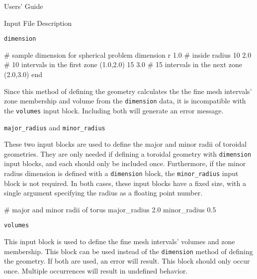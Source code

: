 \begin{chapter}{Users' Guide\label{app:user.guide}}
\begin{section}{Input File Description\label{app:user.input}}
\begin{subsection}{\texttt{dimension}\label{app:user.input.dim}}
      \begin{center}
        \renewcommand{\baselinestretch}{1}\normalsize
        \begin{boxedverbatim}
# sample dimension for spherical problem 
dimension r 1.0      # inside radius 
         10 2.0      # 10 intervals in the first zone (1.0,2.0)
         15 3.0      # 15 intervals in the next zone (2.0,3.0) 
end
\end{boxedverbatim}
      \end{center}
      
      Since this method of defining the geometry calculates the the
      fine mesh intervals' zone membership and volume from the
      \texttt{dimension} data, it is incompatible with the
      \texttt{volumes} input block.  Including both will generate an
      error message.
    \end{subsection}

    \begin{subsection}{\texttt{major\_radius} and  \texttt{minor\_radius} \label{app:user.input.tor_radii}}
      
      These two input blocks are used to define the major and minor
      radii of toroidal geometries.  They are only needed if defining
      a toroidal geometry with \texttt{dimension} input blocks, and
      each should only be included once.  Furthermore, if the minor
      radius dimension is defined with a \texttt{dimension} block, the
      \texttt{minor\_radius} input block is not required.  In both
      cases, these input blocks have a fixed size, with a single
      argument specifying the radius as a floating point number.

      \begin{center}
        \renewcommand{\baselinestretch}{1}\normalsize
        \begin{boxedverbatim}
# major and minor radii of torus
major_radius     2.0
minor_radius     0.5          
\end{boxedverbatim}
      \end{center}

    \end{subsection}

    \begin{subsection}{\texttt{volumes}\label{app:user.input.vol}}
      
      This input block is used to define the fine mesh intervals'
      volumes and zone membership.  This block can be used instead of
      the \texttt{dimension} method of defining the geometry.  If both
      are used, an error will result.  This block should only occur
      once.  Multiple occurrences will result in undefined behavior.
      

\end{subsection}
\end{section}
\end{chapter}
